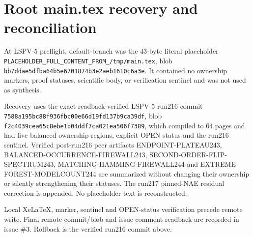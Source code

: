 \documentclass[11pt]{article}
\begin{document}
\section*{Root main.tex recovery and reconciliation}

At LSPV-5 preflight, default-branch  was the 43-byte literal
placeholder \texttt{PLACEHOLDER\_FULL\_CONTENT\_FROM\_/tmp/main.tex}, blob
\texttt{bb7ddae5dfba64b5e6701874b3e2aeb1610c6a3e}.  It contained no ownership
markers, proof statuses, scientific body, or verification sentinel and was not
used as synthesis.

Recovery uses the exact readback-verified LSPV-5 run216 commit
\texttt{7588a195bc88f936fbc00e66d19fd137b9ca39df}, blob
\texttt{f2c4039cea65c8ebe1b04ddf7ca021ea506f7389}, which compiled to 64 pages and
had five balanced ownership regions, explicit OPEN status and the run216
sentinel.  Verified post-run216 peer artifacts ENDPOINT-PLATEAU243,
BALANCED-OCCURRENCE-FIREWALL243, SECOND-ORDER-FLIP-SPECTRUM243,
MATCHING-HAMMING-FIREWALL244 and EXTREME-FOREST-MODELCOUNT244 are summarized
without changing their ownership or silently strengthening their statuses.
The run217 pinned-NAE residual correction is appended.  No placeholder text is
reconstructed.

Local XeLaTeX, marker, sentinel and OPEN-status verification precede remote
write.  Final remote commit/blob and issue-comment readback are recorded in
issue \#3.  Rollback is the verified run216 commit above.

\end{document}
